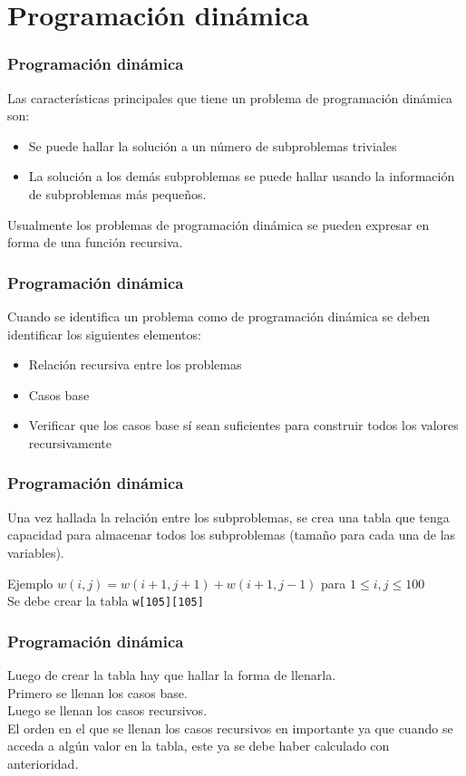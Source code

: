 \documentclass{beamer}
\begin{document}
\section{Programación dinámica}
	\begin{frame}
		\frametitle{Programación dinámica}
		Las características principales que tiene un problema de programación dinámica son:
		\begin{itemize}
			\item Se puede hallar la solución a un número de subproblemas triviales
			\item La solución a los demás subproblemas se puede hallar usando la información de subproblemas más pequeños.
		\end{itemize}
		Usualmente los problemas de programación dinámica se pueden expresar en forma de una función recursiva.
	\end{frame} 
	
	\begin{frame}
		\frametitle{Programación dinámica}
		Cuando se identifica un problema como de programación dinámica se deben identificar los siguientes elementos:
		\begin{itemize}
			\item Relación recursiva entre los problemas
			\item Casos base
			\item Verificar que los casos base sí sean suficientes para construir todos los valores recursivamente
		\end{itemize}
	\end{frame}
	
	\begin{frame}[fragile]
		\frametitle{Programación dinámica}
		Una vez hallada la relación entre los subproblemas, se crea una tabla que tenga capacidad para almacenar todos los subproblemas (tamaño para cada una de las variables).
		\begin{exampleblock}{Ejemplo}
			$w(i, j) = w(i+1, j+1) + w(i+1, j-1)$ para $1 \leq i, j \leq 100$\\
			Se debe crear la tabla \verb|w[105][105]|
		\end{exampleblock}
	\end{frame}
	
	\begin{frame}[fragile]
		\frametitle{Programación dinámica}
		Luego de crear la tabla hay que hallar la forma de llenarla.\\
		Primero se llenan los casos base.\\
		Luego se llenan los casos recursivos.\\
		El orden en el que se llenan los casos recursivos en importante ya que cuando se acceda a algún valor en la tabla, este ya se debe haber calculado con anterioridad.\\
	\end{frame}
	
\end{document}
